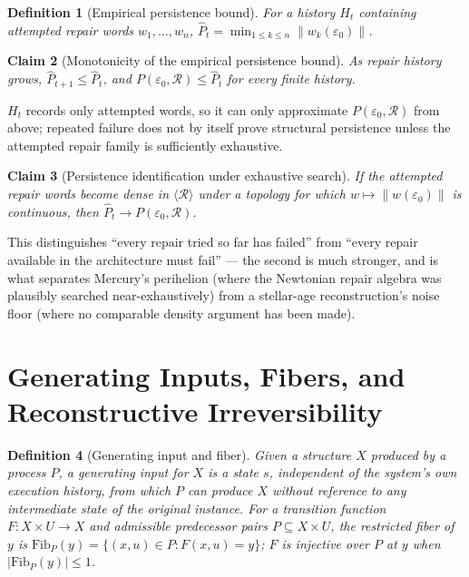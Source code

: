 \documentclass[12pt]{report}
\newtheorem{definition}{Definition}[section]
\newtheorem{claim}[definition]{Claim}
\begin{document}
\begin{definition}[Empirical persistence bound]
For a history $H_t$ containing attempted repair words $w_1,\ldots,w_n$,
$\widehat{P}_t = \min_{1 \leq k \leq n} \|w_k(\varepsilon_0)\|$.
\end{definition}

\begin{claim}[Monotonicity of the empirical persistence bound]
As repair history grows, $\widehat{P}_{t+1} \leq \widehat{P}_t$, and
$P(\varepsilon_0,\mathcal{R}) \leq \widehat{P}_t$ for every finite
history.
\end{claim}

$H_t$ records only attempted words, so it can only approximate
$P(\varepsilon_0,\mathcal{R})$ from above; repeated failure does not by
itself prove structural persistence unless the attempted repair family
is sufficiently exhaustive.

\begin{claim}[Persistence identification under exhaustive search]
If the attempted repair words become dense in $\langle\mathcal{R}\rangle$
under a topology for which $w \mapsto \|w(\varepsilon_0)\|$ is
continuous, then $\widehat{P}_t \to P(\varepsilon_0,\mathcal{R})$.
\end{claim}

This distinguishes ``every repair tried so far has failed'' from ``every
repair available in the architecture must fail'' --- the second is much
stronger, and is what separates Mercury's perihelion (where the
Newtonian repair algebra was plausibly searched near-exhaustively) from
a stellar-age reconstruction's noise floor (where no comparable density
argument has been made).

\section*{Generating Inputs, Fibers, and Reconstructive Irreversibility}

\begin{definition}[Generating input and fiber]
Given a structure $X$ produced by a process $P$, a generating input for
$X$ is a state $s$, independent of the system's own execution history,
from which $P$ can produce $X$ without reference to any intermediate
state of the original instance. For a transition function $F : X \times
U \to X$ and admissible predecessor pairs $P \subseteq X \times U$, the
restricted fiber of $y$ is $\mathrm{Fib}_P(y) = \{(x,u) \in P : F(x,u) =
y\}$; $F$ is injective over $P$ at $y$ when $|\mathrm{Fib}_P(y)| \leq
1$.
\end{definition}
\end{document}
